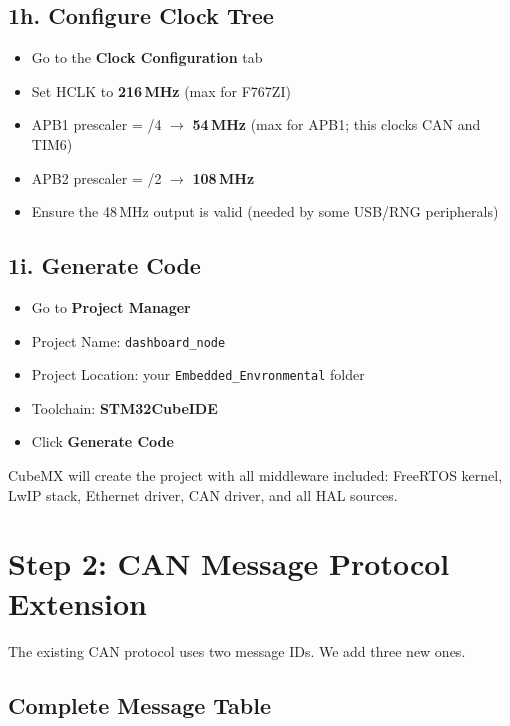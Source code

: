 \documentclass[11pt,a4paper]{article}
\begin{document}
\newpage

\subsection{1h. Configure Clock Tree}
\begin{itemize}[leftmargin=2em]
  \item Go to the \textbf{Clock Configuration} tab
  \item Set HCLK to \textbf{216\,MHz} (max for F767ZI)
  \item APB1 prescaler = /4 $\rightarrow$ \textbf{54\,MHz} (max for APB1; this clocks CAN and TIM6)
  \item APB2 prescaler = /2 $\rightarrow$ \textbf{108\,MHz}
  \item Ensure the 48\,MHz output is valid (needed by some USB/RNG peripherals)
\end{itemize}

\subsection{1i. Generate Code}
\begin{itemize}[leftmargin=2em]
  \item Go to \textbf{Project Manager}
  \item Project Name: \texttt{dashboard\_node}
  \item Project Location: your \texttt{Embedded\_Envronmental} folder
  \item Toolchain: \textbf{STM32CubeIDE}
  \item Click \textbf{Generate Code}
\end{itemize}

CubeMX will create the project with all middleware included: FreeRTOS kernel, LwIP stack, Ethernet driver, CAN driver, and all HAL sources.

\newpage

\section{Step 2: CAN Message Protocol Extension}

The existing CAN protocol uses two message IDs. We add three new ones.

\subsection*{Complete Message Table}
\end{document}

